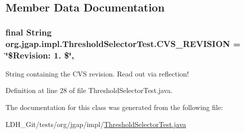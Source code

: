 \subsection{Member Data Documentation}
\hypertarget{classorg_1_1jgap_1_1impl_1_1_threshold_selector_test_a9dab7a6648b0f5898a7ebaaa6064de63}{
\subsubsection[{C\-V\-S\-\_\-\-R\-E\-V\-I\-S\-I\-O\-N}]{\setlength{\rightskip}{0pt plus 5cm}final String org.\-jgap.\-impl.\-Threshold\-Selector\-Test.\-C\-V\-S\-\_\-\-R\-E\-V\-I\-S\-I\-O\-N = \char`\"{}\$Revision\-: 1. \$\char`\"{}\hspace{0.3cm}{\ttfamily [static]}, {\ttfamily [private]}}}\label{classorg_1_1jgap_1_1impl_1_1_threshold_selector_test_a9dab7a6648b0f5898a7ebaaa6064de63}
String containing the C\-V\-S revision. Read out via reflection! 

Definition at line 28 of file Threshold\-Selector\-Test.\-java.



The documentation for this class was generated from the following file\-:\begin{DoxyCompactItemize}
\item 
L\-D\-H\-\_\-\-Git/tests/org/jgap/impl/\hyperlink{_threshold_selector_test_8java}{Threshold\-Selector\-Test.\-java}\end{DoxyCompactItemize}
